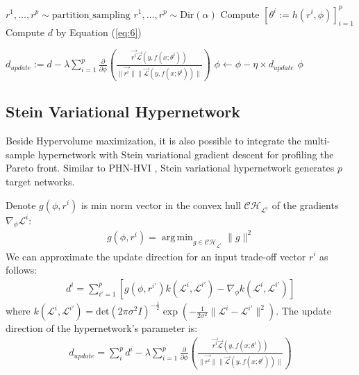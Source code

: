 \documentclass[letterpaper]{article} %
\DeclareMathOperator*{\argmin}{arg\,min}
\newcommand{\ourmodel}{PHN-HVI }
\begin{document}
\begin{algorithm}
\caption{\ourmodel optimization algorithm}
\begin{algorithmic}[1]
\STATE $r^1, \dots, r^p \sim \text{partition\_sampling}$
\ELSE
\STATE $r^1, \dots, r^p \sim \text{Dir}(\alpha)$
\ENDIF
\STATE Compute $\left[\theta^{i} := h(r^i, \phi)\right]_{i=1}^p$ %
\STATE Compute $d$ by Equation (\ref{eq:6})

\STATE $d_{update} := d - \lambda\sum_{i=1}^p \frac{\partial}{\partial \phi}\left( \frac{\vec{r^i}\vec{\mathcal{L}}(y, f\left(x; \theta^{i} \right))}{\|\vec{r^i}\|\|\vec{\mathcal{L}}(y, f\left(x; \theta^{i} \right))\|}\right) $
\STATE $\phi \xleftarrow{} \phi - \eta \times d_{update} $
\ENDWHILE
\RETURN $\phi$
\end{algorithmic}
\label{alg:1}
\end{algorithm}

\subsection{Stein Variational Hypernetwork}
Beside Hypervolume maximization, it is also possible to integrate the multi-sample hypernetwork with Stein variational gradient descent \cite{moosvgd} for profiling the Pareto front. Similar to \ourmodel, Stein variational hypernetwork generates $p$ target networks.

Denote $g(\phi, r^i)$ is min norm vector in the convex hull $\mathcal{CH}_{\mathcal{L}^i}$ of the gradients $\nabla_{\phi}\mathcal{L}^i$:
\begin{align}
g(\phi, r^i) = \argmin_{g \in \mathcal{CH}_{\mathcal{L}^i}} \|g\|^2
\end{align}
We can approximate the update direction for an input trade-off vector $r^i$ as follows:
\begin{align}
d^i = \sum_{i'=1}^p \left[ g(\phi, r^{i'}) k(\mathcal{L}^i, \mathcal{L}^{i'}) - \nabla_{\phi}k(\mathcal{L}^i, \mathcal{L}^{i'}) \right]
\end{align}
where $k(\mathcal{L}^i, \mathcal{L}^{i'})=\text{det}(2\pi \sigma^2I)^{-\frac{1}{2}}\exp(-\frac{1}{2\sigma^2}\|\mathcal{L}^i-\mathcal{L}^{i'}\|^2)$.
The update direction of the hypernetwork's parameter is:
\begin{align}
d_{update} = \sum_i^p d^i - \lambda\sum_{i=1}^p \frac{\partial}{\partial \phi}\left( \frac{\vec{r^i}\vec{\mathcal{L}}(y, f\left(x; \theta^{i} \right))}{\|\vec{r^i}\|\|\vec{\mathcal{L}}(y, f\left(x; \theta^{i} \right))\|}\right)
\end{align}
\end{document}

